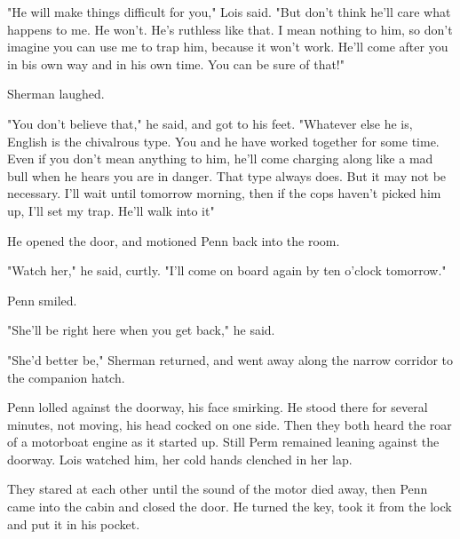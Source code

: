 \documentclass{novel}
\begin{document}
"He will make things difficult for you," Lois said. "But don't think he'll care what happens to me. He won't. He's ruthless like that. I mean nothing to him, so don't imagine you can use me to trap him, because it won't work. He'll come after you in bis own way and in his own time. You can be sure of that!"

Sherman laughed.

"You don't believe that," he said, and got to his feet. "Whatever else he is, English is the chivalrous type. You and he have worked together for some time. Even if you don't mean anything to him, he'll come charging along like a mad bull when he hears you are in danger. That type always does. But it may not be necessary. I'll wait until tomorrow morning, then if the cops haven't picked him up, I'll set my trap. He'll walk into it"

He opened the door, and motioned Penn back into the room.

"Watch her," he said, curtly. "I'll come on board again by ten o'clock tomorrow."

Penn smiled.

"She'll be right here when you get back," he said.

"She'd better be," Sherman returned, and went away along the narrow corridor to the companion hatch.

Penn lolled against the doorway, his face smirking. He stood there for several minutes, not moving, his head cocked on one side. Then they both heard the roar of a motorboat engine as it started up. Still Perm remained leaning against the doorway. Lois watched him, her cold hands clenched in her lap.

They stared at each other until the sound of the motor died away, then Penn came into the cabin and closed the door. He turned the key, took it from the lock and put it in his pocket.

\vspace{2\nbs}
\clearpage
\thispagestyle{empty}

\begin{ChapterStart}
\vspace{3\nbs}
\end{ChapterStart}
    
\end{document}
